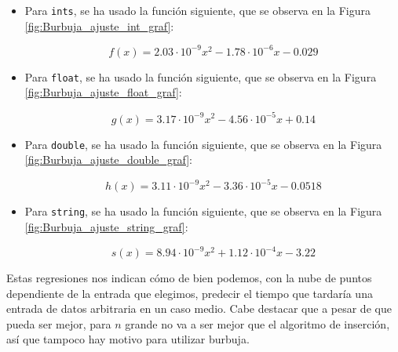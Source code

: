 \documentclass[12pt]{article}
\begin{document}
    
    \begin{itemize}
        \item Para \verb|ints|, se ha usado la función siguiente, que se observa en la Figura \ref{fig:Burbuja_ajuste_int_graf}:

        $$ f(x)= 2.03\cdot10^{-9} x^2 - 1.78\cdot10^{-6}x - 0.029$$
    
        \item Para \verb|float|, se ha usado la función siguiente, que se observa en la Figura \ref{fig:Burbuja_ajuste_float_graf}:

        $$ g(x)= 3.17\cdot10^{-9}x^2 -4.56\cdot10^{-5}x +0.14 $$
    
        \item Para \verb|double|, se ha usado la función siguiente, que se observa en la Figura \ref{fig:Burbuja_ajuste_double_graf}:
        
        $$ h(x)= 3.11\cdot10^{-9}x^2 -3.36\cdot10^{-5}x -0.0518 $$

        \item Para \verb|string|, se ha usado la función siguiente, que se observa en la Figura \ref{fig:Burbuja_ajuste_string_graf}:

        $$ s(x)= 8.94\cdot10^{-9}x^2 + 1.12\cdot10^{-4}x -3.22 $$
    \end{itemize}

    Estas regresiones nos indican cómo de bien podemos, con la nube de puntos dependiente de la entrada que elegimos, predecir el tiempo que tardaría una entrada de datos arbitraria en un caso medio. Cabe destacar que a pesar de que pueda ser mejor, para $n$ grande no va a ser mejor que el algoritmo de inserción, así que tampoco hay motivo para utilizar burbuja.
\end{document}
